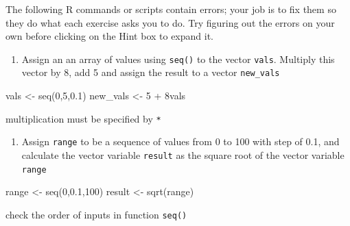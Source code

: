 \documentclass[
  letterpaper,
  DIV=11,
  numbers=noendperiod]{scrreprt}
\newenvironment{Shaded}{\begin{snugshade}}{\end{snugshade}}
\newcommand{\NormalTok}[1]{\textcolor[rgb]{0.00,0.23,0.31}{#1}}
\providecommand{\tightlist}{%
  \setlength{\itemsep}{0pt}\setlength{\parskip}{0pt}}\usepackage{longtable,booktabs,array}
\begin{document}
The following R commands or scripts contain errors; your job is to fix
them so they do what each exercise asks you to do. Try figuring out the
errors on your own before clicking on the Hint box to expand it.

\begin{enumerate}
\def\labelenumi{\arabic{enumi}.}
\tightlist
\item
  Assign an an array of values using \texttt{seq()} to the vector
  \texttt{vals}. Multiply this vector by 8, add 5 and assign the result
  to a vector \texttt{new\_vals}
\end{enumerate}

\begin{Shaded}
\begin{Highlighting}[]
\NormalTok{vals \textless{}{-} seq(0,5,0.1)}
\NormalTok{new\_vals \textless{}{-} 5 + 8vals}
\end{Highlighting}
\end{Shaded}

\begin{tcolorbox}[enhanced jigsaw, arc=.35mm, colframe=quarto-callout-caution-color-frame, left=2mm, opacitybacktitle=0.6, breakable, title=\textcolor{quarto-callout-caution-color}{\faFire}\hspace{0.5em}{Hint}, toprule=.15mm, coltitle=black, bottomtitle=1mm, toptitle=1mm, colback=white, leftrule=.75mm, colbacktitle=quarto-callout-caution-color!10!white, titlerule=0mm, opacityback=0, rightrule=.15mm, bottomrule=.15mm]

multiplication must be specified by \texttt{*}

\end{tcolorbox}

\begin{enumerate}
\def\labelenumi{\arabic{enumi}.}
\setcounter{enumi}{1}
\tightlist
\item
  Assign \texttt{range} to be a sequence of values from 0 to 100 with
  step of 0.1, and calculate the vector variable \texttt{result} as the
  square root of the vector variable \texttt{range}
\end{enumerate}

\begin{Shaded}
\begin{Highlighting}[]
\NormalTok{range \textless{}{-} seq(0,0.1,100)}
\NormalTok{result \textless{}{-} sqrt(range)}
\end{Highlighting}
\end{Shaded}

\begin{tcolorbox}[enhanced jigsaw, arc=.35mm, colframe=quarto-callout-caution-color-frame, left=2mm, opacitybacktitle=0.6, breakable, title=\textcolor{quarto-callout-caution-color}{\faFire}\hspace{0.5em}{Hint}, toprule=.15mm, coltitle=black, bottomtitle=1mm, toptitle=1mm, colback=white, leftrule=.75mm, colbacktitle=quarto-callout-caution-color!10!white, titlerule=0mm, opacityback=0, rightrule=.15mm, bottomrule=.15mm]

check the order of inputs in function \texttt{seq()}

\end{tcolorbox}
\end{document}
